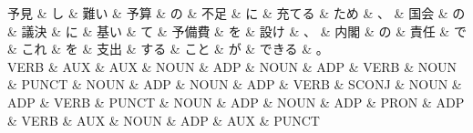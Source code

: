 \documentclass[tikz,border=5pt]{standalone}
\begin{document}
\small
\begin{dependency}[edge unit distance=12.0pt]
    \begin{deptext}[column sep=0.5em]
        予見 \& し \& 難い \& 予算 \& の \& 不足 \& に \& 充てる \& ため \& 、 \& 国会 \& の \& 議決 \& に \& 基い \& て \& 予備費 \& を \& 設け \& 、 \& 内閣 \& の \& 責任 \& で \& これ \& を \& 支出 \& する \& こと \& が \& できる \& 。\\
        VERB \& AUX \& AUX \& NOUN \& ADP \& NOUN \& ADP \& VERB \& NOUN \& PUNCT \& NOUN \& ADP \& NOUN \& ADP \& VERB \& SCONJ \& NOUN \& ADP \& VERB \& PUNCT \& NOUN \& ADP \& NOUN \& ADP \& PRON \& ADP \& VERB \& AUX \& NOUN \& ADP \& AUX \& PUNCT\\
    \end{deptext}
\end{dependency}
\end{document}
